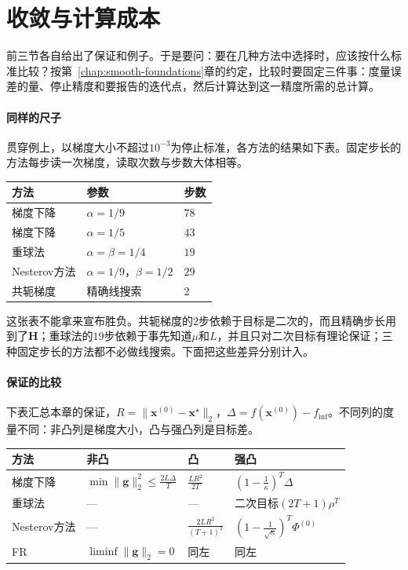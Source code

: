 \section{收敛与计算成本}
\label{sec:fom-cost}

前三节各自给出了保证和例子。于是要问：要在几种方法中选择时，应该按什么标准比较？按第~\ref{chap:smooth-foundations}章的约定，比较时要固定三件事：度量误差的量、停止精度和要报告的迭代点，然后计算达到这一精度所需的总计算。

\paragraph{同样的尺子}
贯穿例上，以梯度大小不超过$10^{-3}$为停止标准，各方法的结果如下表。固定步长的方法每步读一次梯度，读取次数与步数大体相等。

\begin{BookInlineTable}
  \centering
  \caption{贯穿例上达到$\lVert\bm{g}\rVert_2\leq10^{-3}$的步数。}
  \label{tab:fom-example-count}
  \begin{tabular}{lll}
   \toprule
   方法 & 参数 & 步数\\
   \midrule
   梯度下降 & $\alpha=1/9$ & $78$\\
   梯度下降 & $\alpha=1/5$ & $43$\\
   重球法 & $\alpha=\beta=1/4$ & $19$\\
   Nesterov方法 & $\alpha=1/9$，$\beta=1/2$ & $29$\\
   共轭梯度 & 精确线搜索 & $2$\\
   \bottomrule
  \end{tabular}
\end{BookInlineTable}

这张表不能拿来宣布胜负。共轭梯度的$2$步依赖于目标是二次的，而且精确步长用到了$\bm{H}$；重球法的$19$步依赖于事先知道$\mu$和$L$，并且只对二次目标有理论保证；三种固定步长的方法都不必做线搜索。下面把这些差异分别计入。

\paragraph{保证的比较}
下表汇总本章的保证，$R=\lVert\bm{x}^{(0)}-\bm{x}^\star\rVert_2$，$\Delta=f(\bm{x}^{(0)})-f_{\inf}$。不同列的度量不同：非凸列是梯度大小，凸与强凸列是目标差。

\begin{BookInlineTable}
  \centering
  \caption{各方法的理论保证，$\Phi^{(0)}=f(\bm{x}^{(0)})-f^\star+\tfrac\mu2R^2$，“—”表示本章不给结论。}
  \label{tab:fom-guarantees}
  \begin{tabular}{llll}
   \toprule
   方法 & 非凸 & 凸 & 强凸\\
   \midrule
   梯度下降 & $\min\lVert\bm{g}\rVert_2^2\leq\frac{2L\Delta}{T}$ & $\frac{LR^2}{2T}$ & $(1-\frac1\kappa)^T\Delta$\\
   重球法 & — & — & 二次目标$(2T+1)\rho^T$\\
   Nesterov方法 & — & $\frac{2LR^2}{(T+1)^2}$ & $(1-\frac{1}{\sqrt\kappa})^T\Phi^{(0)}$\\
   FR & $\liminf\lVert\bm{g}\rVert_2=0$ & 同左 & 同左\\
   \bottomrule
  \end{tabular}
\end{BookInlineTable}

